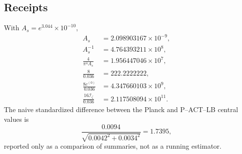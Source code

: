 \documentclass[11pt]{article}
\numberwithin{equation}{section}
\newcommand{\Iz}{\mathcal I_\zeta}
\newcommand{\cz}{c^{(0)}}
\theoremstyle{definition}
\theoremstyle{remark}
\begin{document}
\subsection{Receipts}
With $A_s=e^{3.044}\times10^{-10}$,
\begin{align}
A_s&=2.098903167\times10^{-9},\\
A_s^{-1}&=4.764393211\times10^8,\\
\frac{4}{\pi^4A_s}&=1.956447046\times10^7,\\
\frac8{0.036}&=222.2222222,\\
\frac{8\cz}{0.036}&=4.347660103\times10^9,\\
\frac{16\Iz}{0.036}&=2.117508094\times10^{11}.
\end{align}
The naive standardized difference between the Planck and P--ACT--LB central values is
\begin{equation}
\frac{0.0094}{\sqrt{0.0042^2+0.0034^2}}=1.7395,
\end{equation}
reported only as a comparison of summaries, not as a running estimator.
\end{document}
